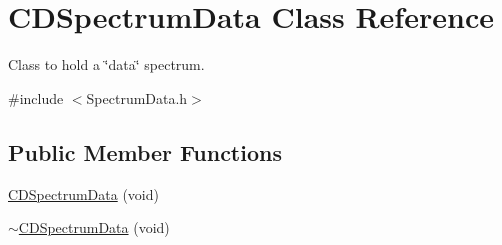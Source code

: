 \hypertarget{classCDSpectrumData}{
\section{CDSpectrumData Class Reference}
\label{classCDSpectrumData}
}


Class to hold a \char`\"{}data\char`\"{} spectrum.  




{\ttfamily \#include $<$SpectrumData.h$>$}

\subsection*{Public Member Functions}
\begin{DoxyCompactItemize}
\item 
\hyperlink{classCDSpectrumData_a70072450e46cc86cdd9414e09d4c041e}{CDSpectrumData} (void)
\item 
\hyperlink{classCDSpectrumData_a67811669ebf4b9c6d2191320de1d98ea}{$\sim$CDSpectrumData} (void)
\end{DoxyCompactItemize}
\label{_amgrpd41d8cd98f00b204e9800998ecf8427e}
